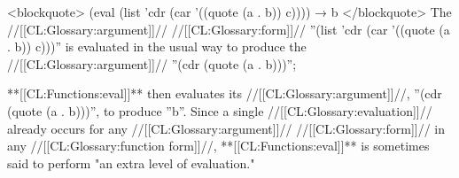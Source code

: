 <blockquote> (eval (list 'cdr (car '((quote (a . b)) c)))) → b </blockquote> The //[[CL:Glossary:argument]]// //[[CL:Glossary:form]]// ''(list 'cdr (car '((quote (a . b)) c)))'' is evaluated in the usual way to produce the //[[CL:Glossary:argument]]// ''(cdr (quote (a . b)))'';

**[[CL:Functions:eval]]** then evaluates its //[[CL:Glossary:argument]]//, ''(cdr (quote (a . b)))'', to produce ''b''. Since a single //[[CL:Glossary:evaluation]]// already occurs for any //[[CL:Glossary:argument]]// //[[CL:Glossary:form]]// in any //[[CL:Glossary:function form]]//, **[[CL:Functions:eval]]** is sometimes said to perform "an extra level of evaluation."

  
